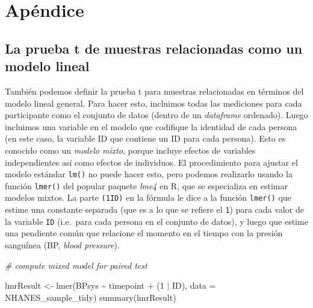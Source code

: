 \documentclass[
  12pt,
]{book}
\newenvironment{Shaded}{\begin{snugshade}}{\end{snugshade}}
\newcommand{\AttributeTok}[1]{\textcolor[rgb]{0.77,0.63,0.00}{#1}}
\newcommand{\CommentTok}[1]{\textcolor[rgb]{0.56,0.35,0.01}{\textit{#1}}}
\newcommand{\DecValTok}[1]{\textcolor[rgb]{0.00,0.00,0.81}{#1}}
\newcommand{\FunctionTok}[1]{\textcolor[rgb]{0.00,0.00,0.00}{#1}}
\newcommand{\NormalTok}[1]{#1}
\newcommand{\OtherTok}[1]{\textcolor[rgb]{0.56,0.35,0.01}{#1}}
\newcommand{\SpecialCharTok}[1]{\textcolor[rgb]{0.00,0.00,0.00}{#1}}
\begin{document}
\hypertarget{apuxe9ndice-6}{%
\section{Apéndice}\label{apuxe9ndice-6}}

\hypertarget{la-prueba-t-de-muestras-relacionadas-como-un-modelo-lineal}{%
\subsection{La prueba t de muestras relacionadas como un modelo lineal}\label{la-prueba-t-de-muestras-relacionadas-como-un-modelo-lineal}}

También podemos definir la prueba t para muestras relacionadas en términos del modelo lineal general. Para hacer esto, incluimos todas las mediciones para cada participante como el conjunto de datos (dentro de un \emph{dataframe} ordenado). Luego incluimos una variable en el modelo que codifique la identidad de cada persona (en este caso, la variable ID que contiene un ID para cada persona). Esto es conocido como un \emph{modelo mixto}, porque incluye efectos de variables independientes así como efectos de individuos. El procedimiento para ajustar el modelo estándar \texttt{lm()} no puede hacer esto, pero podemos realizarlo usando la función \texttt{lmer()} del popular paquete \emph{lme4} en R, que se especializa en estimar modelos mixtos. La parte \texttt{(1\textbar{}ID)} en la fórmula le dice a la función \texttt{lmer()} que estime una constante separada (que es a lo que se refiere el \texttt{1}) para cada valor de la variable \texttt{ID} (i.e.~para cada persona en el conjunto de datos), y luego que estime una pendiente común que relacione el momento en el tiempo con la presión sanguínea (BP, \emph{blood pressure}).

\begin{Shaded}
\begin{Highlighting}[]
\CommentTok{\# compute mixed model for paired test}

\NormalTok{lmrResult }\OtherTok{\textless{}{-}} \FunctionTok{lmer}\NormalTok{(BPsys }\SpecialCharTok{\textasciitilde{}}\NormalTok{ timepoint }\SpecialCharTok{+}\NormalTok{ (}\DecValTok{1} \SpecialCharTok{|}\NormalTok{ ID), }
                  \AttributeTok{data =}\NormalTok{ NHANES\_sample\_tidy)}
\FunctionTok{summary}\NormalTok{(lmrResult)}
\end{Highlighting}
\end{Shaded}
\end{document}
